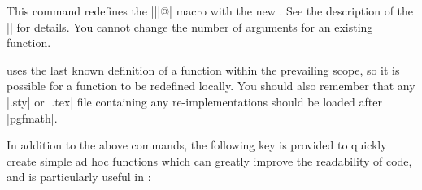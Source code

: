 \begin{command}{\pgfmathredeclarefunction{}}

  This command redefines the |\pgfmath||@| macro
  with the new . See the description of the
  |\pgfmathdeclarefunction| for details. You cannot change the number
  of arguments for an existing function.

\end{command}

  \pgfname{} uses the last known definition of a function within the
  prevailing scope, so it is possible for a function to be redefined
  locally. You should also remember that any |.sty| or |.tex| file
  containing any re-implementations should be loaded after |pgfmath|.

  In addition to the above commands, the following key is provided to
  quickly create simple ad hoc functions which can greatly improve
  the readability of code, and is particularly useful in \tikzname{}:

